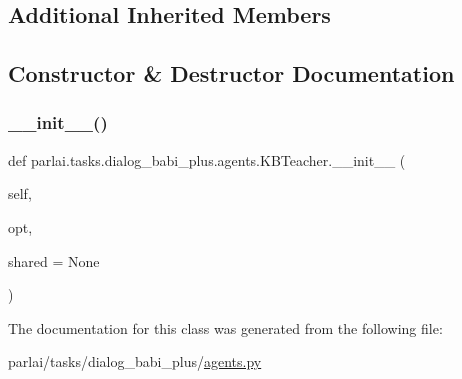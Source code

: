 \subsection*{Additional Inherited Members}


\subsection{Constructor \& Destructor Documentation}
\mbox{\label{classparlai_1_1tasks_1_1dialog__babi__plus_1_1agents_1_1KBTeacher_aa291d9b9f60df40b085271f0dd7d3b0e}} 
\subsubsection{\texorpdfstring{\+\_\+\+\_\+init\+\_\+\+\_\+()}{\_\_init\_\_()}}
{\footnotesize\ttfamily def parlai.\+tasks.\+dialog\+\_\+babi\+\_\+plus.\+agents.\+K\+B\+Teacher.\+\_\+\+\_\+init\+\_\+\+\_\+ (\begin{DoxyParamCaption}\item[{}]{self,  }\item[{}]{opt,  }\item[{}]{shared = {\ttfamily None} }\end{DoxyParamCaption})}



The documentation for this class was generated from the following file\+:\begin{DoxyCompactItemize}
\item 
parlai/tasks/dialog\+\_\+babi\+\_\+plus/\hyperlink{parlai_2tasks_2dialog__babi__plus_2agents_8py}{agents.\+py}\end{DoxyCompactItemize}
